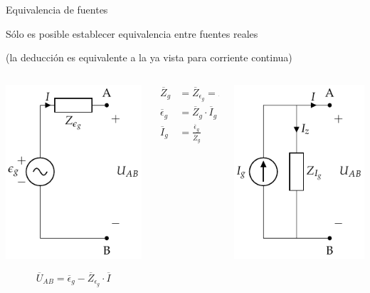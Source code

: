 \documentclass[aspectratio=169, usenames,svgnames,dvipsnames]{beamer}
\begin{document}
\begin{frame}{Equivalencia de fuentes}

    \vspace{3mm}
    Sólo es posible establecer equivalencia entre \alert{fuentes reales}

    (la deducción es equivalente a la ya vista para corriente continua)

    \vspace{-2mm}
    \begin{columns}
    \begin{column}{0.33\columnwidth}
    \begin{center}
        \includegraphics[height=0.5\textheight]{../figs/FuenteTensionReal.pdf}
    \end{center}
    \[
      \overline{U}_{AB} = \overline{\epsilon}_g - \overline{Z}_{\epsilon_g} \cdot \overline{I}
    \]
    \end{column}
    \begin{column}{0.33\columnwidth}
    \begin{align*}
      \overline{Z}_g &= \overline{Z}_{\epsilon_g} = \overline{Z}_{I_g}\\[3mm]
      \overline{\epsilon}_g &= \overline{Z}_g \cdot \overline{I}_g\\[3mm]
      \overline{I}_g &= \frac{\overline{\epsilon}_g}{\overline{Z}_g}
    \end{align*}
    \end{column}
    \begin{column}{0.33\columnwidth}
    \begin{center}
        \includegraphics[height=0.5\textheight]{../figs/FuenteCorrienteReal.pdf}

\end{center}
\end{column}
\end{columns}
\end{frame}
\end{document}
